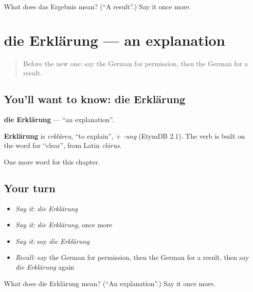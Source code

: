 \begin{tcolorbox}[breakable,colback=teal!4,colframe=teal!35!black,title={Before you move on}]
What does das Ergebnis mean? (\textquotedblleft{}A result\textquotedblright{}.) Say it once more.
\end{tcolorbox}
\section[die Erklärung]{die Erklärung — an explanation}

\label{lesson:GE-C228-erklaerung}



\begin{quote}
Before the new one: say the German for permission, then the German for a result.
\end{quote}

\subsection*{You'll want to know: die Erklärung}
\textbf{die Erklärung} — \textquotedblleft{}an explanation\textquotedblright{}.

\begin{cousinweb}
\textbf{Erklärung} is \emph{erklären}, \textquotedblleft{}to explain\textquotedblright{}, + \emph{-ung} (EtymDB 2.1). The verb is built on the word for \textquotedblleft{}clear\textquotedblright{}, from Latin \emph{clārus}.
\end{cousinweb}

\begin{grammarlens}[title={What you've built}]
One more word for this chapter.
\end{grammarlens}

\subsection*{Your turn}
\begin{itemize}
\raggedright
  \item \emph{Say it:} \emph{die Erklärung}
  \item \emph{Say it:} \emph{die Erklärung}, once more
  \item \emph{Say it:} say \emph{die Erklärung}
  \item \emph{Recall:} say the German for permission, then the German for a result, then say \emph{die Erklärung} again
\end{itemize}

\begin{tcolorbox}[breakable,colback=teal!4,colframe=teal!35!black,title={Before you move on}]
What does die Erklärung mean? (\textquotedblleft{}An explanation\textquotedblright{}.) Say it once more.
\end{tcolorbox}
